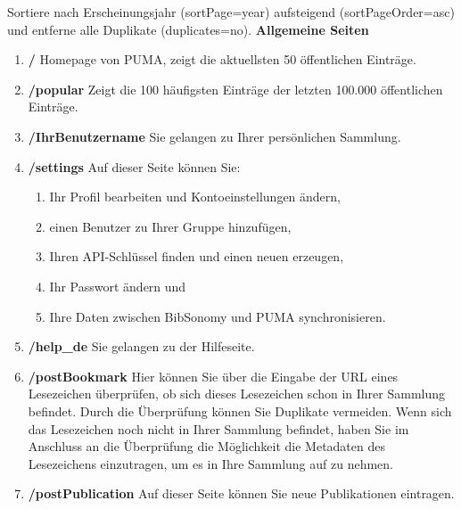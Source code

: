 Sortiere nach Erscheinungsjahr (sortPage=year) aufsteigend (sortPageOrder=asc) und entferne alle Duplikate (duplicates=no). \newline
\newline
\textbf{Allgemeine Seiten}
\begin{enumerate}
    \item \textbf{/} \newline
    Homepage von PUMA, zeigt die aktuellsten 50 öffentlichen Einträge.
    \item \textbf{/popular} \newline
    Zeigt die 100 häufigsten Einträge der letzten 100.000 öffentlichen Einträge.
    \item \textbf{/IhrBenutzername} \newline
    Sie gelangen zu Ihrer persönlichen Sammlung.
    \item \textbf{/settings} \newline
    Auf dieser Seite können Sie:
    \begin{enumerate}
        \item Ihr Profil bearbeiten und Kontoeinstellungen ändern,
        \item einen Benutzer zu Ihrer Gruppe hinzufügen,
        \item Ihren API-Schlüssel finden und einen neuen erzeugen,
        \item Ihr Passwort ändern und
        \item Ihre Daten zwischen BibSonomy und PUMA synchronisieren.
    \end{enumerate}
    \item \textbf{/help\_de} \newline
    Sie gelangen zu der Hilfeseite.
    \item \textbf{/postBookmark} \newline
    Hier können Sie über die Eingabe der URL eines Lesezeichen überprüfen, ob sich dieses Lesezeichen schon in Ihrer Sammlung befindet. Durch die Überprüfung können Sie Duplikate vermeiden. Wenn sich das Lesezeichen noch nicht in Ihrer Sammlung befindet, haben Sie im Anschluss an die Überprüfung die Möglichkeit die Metadaten des Lesezeichens einzutragen, um es in Ihre Sammlung auf zu nehmen.
    \item \textbf{/postPublication} \newline
    Auf dieser Seite können Sie neue Publikationen eintragen. 

\end{enumerate}
